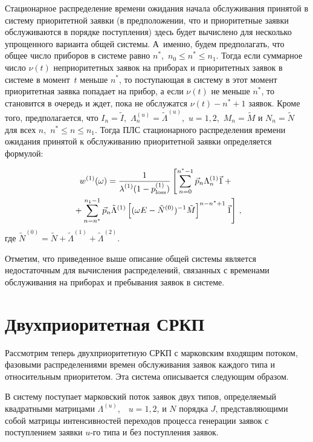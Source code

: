 \begin{multicols}{2}
Стационарное распределение времени ожи\-дания
начала обслуживания принятой в систему\linebreak
приоритетной заявки (в предположении, что и приоритетные заявки
обслуживаются в порядке поступления)
здесь будет вычислено для несколько упрощенного
варианта общей системы.
А~именно, будем предполагать, что общее число приборов в системе равно
$n^*$,\ $n_0 \le n^* \le n_1$.
Тогда если суммарное число $\nu(t)$ неприоритетных заявок на приборах
и приоритетных заявок в системе в момент~$t$ меньше $n^*$, то
поступающая в систему в этот момент приоритетная заявка попадает на
прибор, а если $\nu(t)$ не меньше $n^*$, то становится в очередь и
ждет, пока не обслужатся $\nu(t)-n^*+1$ заявок.
Кроме того, предполагается, что $I_n = \tilde I$,\ 
$\Lambda_n^{(u)}=\tilde \Lambda^{(u)}$,\  $u=1,2$,\  $M_n=\tilde M$
и $N_n=\tilde N$ для всех $n$,\  $n^*\le n \le n_1$.
Тогда ПЛС стационарного распределения времени ожидания принятой к
обслуживанию приоритетной заявки определяется формулой:

\noindent
\begin{multline*}
w^{(1)}(\omega) = \displaystyle\frac{\displaystyle 1\mathstrut}{\displaystyle \lambda^{(1)} (1-p^{(1)}_{\mathrm{loss}})\mathstrut}
\left[ 
\sum_{n=0}^{n^*-1} \vec p_{n}
\Lambda_n^{(1)} \vec 1 +{}\right.\\
\left.{}+ \sum_{n=n^*}^{n_1-1} \vec p_{n} \tilde \Lambda^{(1)}
\left[(\omega E - \tilde N^{(0)})^{-1} \tilde M\right]^{n-n^*+1}
\vec 1 \right]\,,
\end{multline*}
где
$\tilde N^{(0)}=\tilde N+\tilde \Lambda^{(1)}+\tilde \Lambda^{(2)}$.

\columnbreak

Отметим, что приведенное выше описание общей системы является
недостаточным для вы\-чис\-ле\-ния распределений, связанных с временами
обслуживания на приборах и пребывания заявок в системе.

\vspace*{-12pt}

\section{Двухприоритетная СРКП}

\vspace*{-12pt}

Рассмотрим теперь двухприоритетную СРКП с марковским входящим потоком, фазовыми распределениями времен
обслуживания заявок каждого типа и относительным приоритетом.
Эта система описывается следующим образом.

В систему поступает марковский поток заявок двух типов,
определяемый квадратными матрицами $\Lambda^{(u)}$,\ \ $u=1,2$,
и $N$ порядка $J$, представляющими собой матрицы
интенсивностей переходов процесса генерации заявок с
поступлением заявки $u$-го типа и без поступления заявок.


\end{multicols}

